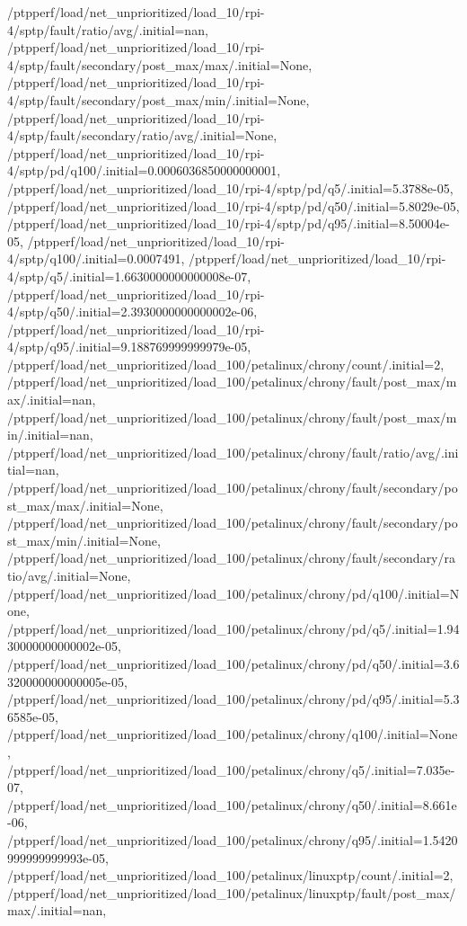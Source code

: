 {    /ptpperf/load/net_unprioritized/load_10/rpi-4/sptp/fault/ratio/avg/.initial=nan,
    /ptpperf/load/net_unprioritized/load_10/rpi-4/sptp/fault/secondary/post_max/max/.initial=None,
    /ptpperf/load/net_unprioritized/load_10/rpi-4/sptp/fault/secondary/post_max/min/.initial=None,
    /ptpperf/load/net_unprioritized/load_10/rpi-4/sptp/fault/secondary/ratio/avg/.initial=None,
    /ptpperf/load/net_unprioritized/load_10/rpi-4/sptp/pd/q100/.initial=0.0006036850000000001,
    /ptpperf/load/net_unprioritized/load_10/rpi-4/sptp/pd/q5/.initial=5.3788e-05,
    /ptpperf/load/net_unprioritized/load_10/rpi-4/sptp/pd/q50/.initial=5.8029e-05,
    /ptpperf/load/net_unprioritized/load_10/rpi-4/sptp/pd/q95/.initial=8.50004e-05,
    /ptpperf/load/net_unprioritized/load_10/rpi-4/sptp/q100/.initial=0.0007491,
    /ptpperf/load/net_unprioritized/load_10/rpi-4/sptp/q5/.initial=1.6630000000000008e-07,
    /ptpperf/load/net_unprioritized/load_10/rpi-4/sptp/q50/.initial=2.3930000000000002e-06,
    /ptpperf/load/net_unprioritized/load_10/rpi-4/sptp/q95/.initial=9.188769999999979e-05,
    /ptpperf/load/net_unprioritized/load_100/petalinux/chrony/count/.initial=2,
    /ptpperf/load/net_unprioritized/load_100/petalinux/chrony/fault/post_max/max/.initial=nan,
    /ptpperf/load/net_unprioritized/load_100/petalinux/chrony/fault/post_max/min/.initial=nan,
    /ptpperf/load/net_unprioritized/load_100/petalinux/chrony/fault/ratio/avg/.initial=nan,
    /ptpperf/load/net_unprioritized/load_100/petalinux/chrony/fault/secondary/post_max/max/.initial=None,
    /ptpperf/load/net_unprioritized/load_100/petalinux/chrony/fault/secondary/post_max/min/.initial=None,
    /ptpperf/load/net_unprioritized/load_100/petalinux/chrony/fault/secondary/ratio/avg/.initial=None,
    /ptpperf/load/net_unprioritized/load_100/petalinux/chrony/pd/q100/.initial=None,
    /ptpperf/load/net_unprioritized/load_100/petalinux/chrony/pd/q5/.initial=1.9430000000000002e-05,
    /ptpperf/load/net_unprioritized/load_100/petalinux/chrony/pd/q50/.initial=3.6320000000000005e-05,
    /ptpperf/load/net_unprioritized/load_100/petalinux/chrony/pd/q95/.initial=5.36585e-05,
    /ptpperf/load/net_unprioritized/load_100/petalinux/chrony/q100/.initial=None,
    /ptpperf/load/net_unprioritized/load_100/petalinux/chrony/q5/.initial=7.035e-07,
    /ptpperf/load/net_unprioritized/load_100/petalinux/chrony/q50/.initial=8.661e-06,
    /ptpperf/load/net_unprioritized/load_100/petalinux/chrony/q95/.initial=1.5420999999999993e-05,
    /ptpperf/load/net_unprioritized/load_100/petalinux/linuxptp/count/.initial=2,
    /ptpperf/load/net_unprioritized/load_100/petalinux/linuxptp/fault/post_max/max/.initial=nan,
}
